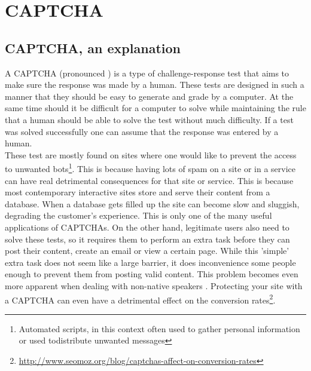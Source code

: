 \documentclass[pdftex,a4paper,12pt,twoside]{report}
\theoremstyle{plain} \newtheorem{theorem}{Theorem} \newtheorem{proposition}{Proposition} \newtheorem{lemma}{Lemma} \newtheorem*{corollary}{Corollary}
\theoremstyle{definition} \newtheorem{definition}{Definition} \newtheorem{conjecture}{Conjecture} \newtheorem*{example}{Example} \newtheorem{algorithm}{Algorithm}
\theoremstyle{remark} \newtheorem*{remark}{Remark} \newtheorem*{note}{Note} \newtheorem{case}{Case}
\begin{document}
\section{CAPTCHA}
\label{sec:captcha}
\subsection{CAPTCHA, an explanation}
A CAPTCHA (pronounced ) is a type of challenge-response test that aims to make sure the response was made by a human. These tests are designed in such a manner that they should be easy to generate and grade by a computer. At the same time should it be difficult for a computer to solve  while maintaining the rule that a human should be able to solve the test without much difficulty. If a test was solved successfully one can assume that the response was entered by a human.\\These test are mostly found on sites where one would like to prevent the access to unwanted bots\footnote{Automated scripts, in this context often used to gather personal information or used todistribute unwanted messages}. This is because having lots of spam on a site or in a service can have real detrimental consequences for that site or service. This is because most contemporary interactive sites store and serve their content from a database. When a database gets filled up the site can become slow and sluggish, degrading the customer's experience. This is only one of the many useful applications of CAPTCHAs. On the other hand, legitimate users also need to solve these tests, so it requires them to perform an extra task before they can post their content, create an email or view a certain page. While this 'simple' extra task does not seem like a large barrier, it does inconvenience some people enough to prevent them from posting valid content. This problem becomes even more apparent when dealing with non-native speakers \citep{Banday2011}. Protecting your site with a CAPTCHA can even have a detrimental effect on the conversion rates\footnote{\url{http://www.seomoz.org/blog/captchas-affect-on-conversion-rates}}.
\end{document}
